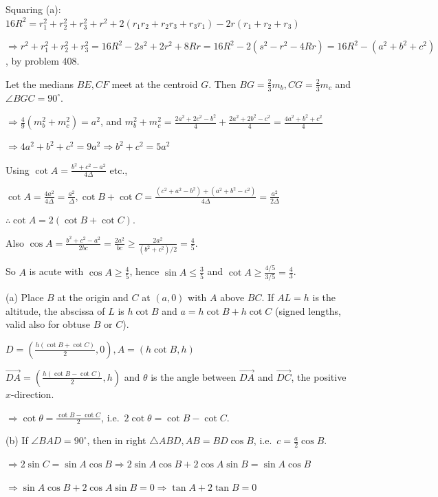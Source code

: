   Squaring (a): $16R^2 = r_1^2 + r_2^2 + r_3^2 + r^2 + 2(r_1r_2 + r_2r_3 + r_3r_1) - 2r(r_1 + r_2 + r_3)$

  $\Rightarrow r^2 + r_1^2 + r_2^2 + r_3^2 = 16R^2 - 2s^2 + 2r^2 + 8Rr = 16R^2 - 2(s^2 - r^2 - 4Rr) = 16R^2 -
  (a^2 + b^2 + c^2)$, by problem 408.
\item Let the medians $BE, CF$ meet at the centroid $G$. Then $BG = \frac{2}{3}m_b, CG = \frac{2}{3}m_c$
  and $\angle BGC = 90^\circ$.

  $\Rightarrow \frac{4}{9}(m_b^2 + m_c^2) = a^2$, and $m_b^2 + m_c^2 = \frac{2a^2 + 2c^2 - b^2}{4} + \frac{2a^2
  + 2b^2 - c^2}{4} = \frac{4a^2 + b^2 + c^2}{4}$

  $\Rightarrow 4a^2 + b^2 + c^2 = 9a^2\Rightarrow b^2 + c^2 = 5a^2$

  Using $\cot A = \frac{b^2 + c^2 - a^2}{4\Delta}$ etc.,

  $\cot A = \frac{4a^2}{4\Delta} = \frac{a^2}{\Delta}, \cot B + \cot C = \frac{(c^2 + a^2 - b^2) + (a^2 + b^2 -
  c^2)}{4\Delta} = \frac{a^2}{2\Delta}$

  $\therefore \cot A = 2(\cot B + \cot C)$.

  Also $\cos A = \frac{b^2 + c^2 - a^2}{2bc} = \frac{2a^2}{bc}\geq\frac{2a^2}{(b^2 + c^2)/2} =
  \frac{4}{5}$.

  So $A$ is acute with $\cos A\geq\frac{4}{5}$, hence $\sin A\leq\frac{3}{5}$ and $\cot A\geq\frac{4/5}{3/5}
  = \frac{4}{3}$.
\item (a) Place $B$ at the origin and $C$ at $(a, 0)$ with $A$ above $BC$. If $AL = h$ is the altitude, the
  abscissa of $L$ is $h\cot B$ and $a = h\cot B + h\cot C$ (signed lengths, valid also for obtuse $B$ or $C$).

  $D = \left(\frac{h(\cot B + \cot C)}{2}, 0\right), A = (h\cot B, h)$

  $\overrightarrow{DA} = \left(\frac{h(\cot B - \cot C)}{2}, h\right)$ and $\theta$ is the angle between
  $\overrightarrow{DA}$ and $\overrightarrow{DC}$, the positive $x$-direction.

  $\Rightarrow \cot\theta = \frac{\cot B - \cot C}{2}$, i.e.\ $2\cot\theta = \cot B - \cot C$.

  (b) If $\angle BAD = 90^\circ$, then in right $\triangle ABD, AB = BD\cos B$, i.e.\ $c = \frac{a}{2}\cos
  B$.

  $\Rightarrow 2\sin C = \sin A\cos B\Rightarrow 2\sin A\cos B + 2\cos A\sin B = \sin A\cos B$

  $\Rightarrow \sin A\cos B + 2\cos A\sin B = 0\Rightarrow \tan A + 2\tan B = 0$

